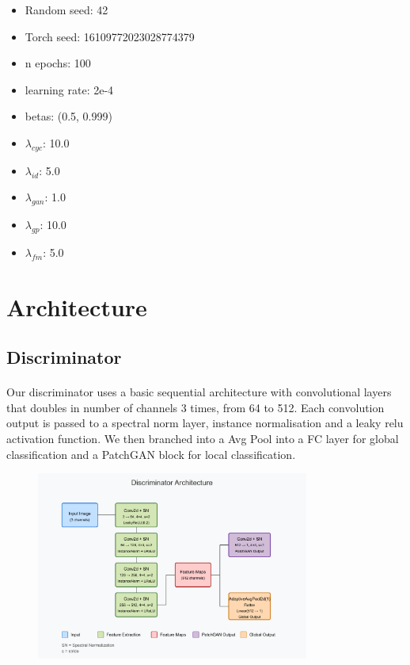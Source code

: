 \documentclass[twoside,english,notitlepage]{report}
\begin{document}
\begin{multicols}{2}
    \begin{itemize}
        \item Random seed: 42
        \item Torch seed: 16109772023028774379
        \item n epochs: 100
        \item learning rate: 2e-4
        \item betas: (0.5, 0.999)
        \item $\lambda_{cyc}$: 10.0
        \item $\lambda_{id}$: 5.0
        \item $\lambda_{gan}$: 1.0
        \item $\lambda_{gp}$: 10.0
        \item $\lambda_{fm}$: 5.0
    \end{itemize}
\end{multicols}



\section{Architecture}
\subsection{Discriminator}
\paragraph{} Our discriminator uses a basic sequential architecture with convolutional layers that doubles in number of channels 3 times, from 64 to 512. Each convolution output is passed to a spectral norm layer, instance normalisation and a leaky relu activation function. We then branched into a Avg Pool into a FC layer for global classification and a PatchGAN block for local classification.

\begin{figure}[h]
    \centering
    \includegraphics[width=0.8\textwidth]{task1/discriminator-architecture.pdf}
\end{figure}
\end{document}
